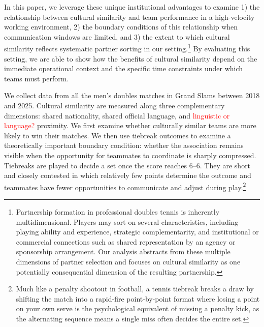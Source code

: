 \documentclass[10pt]{article}
\begin{document}
In this paper, we leverage these unique institutional advantages to examine 1) the relationship between cultural similarity and team performance in a high-velocity working environment, 2) the boundary conditions of this relationship when communication windows are limited, and 3) the extent to which cultural similarity reflects systematic partner sorting in our setting.\footnote{Partnership formation in professional doubles tennis is inherently multidimensional. Players may sort on several characteristics, including playing ability and experience, strategic complementarity, and institutional or commercial connections such as shared representation by an agency or sponsorship arrangement. Our analysis abstracts from these multiple dimensions of partner selection and focuses on cultural similarity as one potentially consequential dimension of the resulting partnership.} By evaluating this setting, we are able to show how the benefits of cultural similarity depend on the immediate operational context and the specific time constraints under which teams must perform.

We collect data from all the men's doubles matches in Grand Slams between 2018 and 2025.  Cultural similarity are measured along three complementary dimensions: shared nationality, shared official language, and \textcolor{red}{linguistic or language?} proximity. We first examine whether culturally similar teams are more likely to win their matches. We then use tiebreak outcomes to examine a theoretically important boundary condition: whether the association remains visible when the opportunity for teammates to coordinate is sharply compressed. Tiebreaks are played to decide a set once the score reaches 6--6. They are short and closely contested in which relatively few points determine the outcome and teammates have fewer opportunities to communicate and adjust during play.\footnote{Much like a penalty shootout in football, a tennis tiebreak breaks a draw by shifting the match into a rapid-fire point-by-point format where losing a point on your own serve is the psychological equivalent of missing a penalty kick, as the alternating sequence means a single miss often decides the entire set.}
\end{document}

